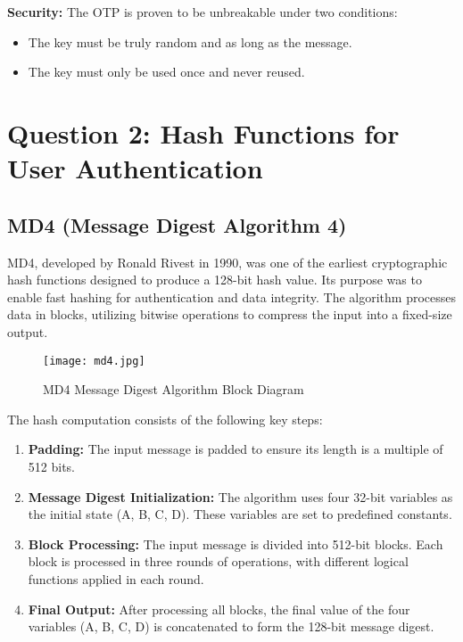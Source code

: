 \documentclass[a4paper,12pt]{article}
\begin{document}
\textbf{Security:} The OTP is proven to be unbreakable under two conditions:
\begin{itemize}
    \item The key must be truly random and as long as the message.
    \item The key must only be used once and never reused.
\end{itemize}

\newpage
\section*{Question 2: Hash Functions for User Authentication}

\subsection*{MD4 (Message Digest Algorithm 4)}
MD4, developed by Ronald Rivest in 1990, was one of the earliest cryptographic hash functions designed to produce a 128-bit hash value. Its purpose was to enable fast hashing for authentication and data integrity. The algorithm processes data in blocks, utilizing bitwise operations to compress the input into a fixed-size output.

\begin{figure}[H]
    \centering
    \texttt{[image: md4.jpg]}  %
    \caption{MD4 Message Digest Algorithm Block Diagram}
    \label{fig:md4_diagram}
\end{figure}

The hash computation consists of the following key steps:
\begin{enumerate}
    \item \textbf{Padding:} The input message is padded to ensure its length is a multiple of 512 bits.
    \item \textbf{Message Digest Initialization:} The algorithm uses four 32-bit variables as the initial state (A, B, C, D). These variables are set to predefined constants.
    \item \textbf{Block Processing:} The input message is divided into 512-bit blocks. Each block is processed in three rounds of operations, with different logical functions applied in each round.
    \item \textbf{Final Output:} After processing all blocks, the final value of the four variables (A, B, C, D) is concatenated to form the 128-bit message digest.
\end{enumerate}
\end{document}
